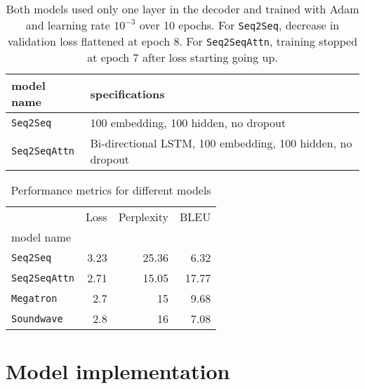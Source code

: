 \documentclass[12pt]{article}
\begin{document}
\begin{landscape}
\begin{table}[tb]
    
    \centering
\begin{tabular}{ll}
\toprule
model name                   &specifications\\
\midrule
\texttt{Seq2Seq} & 100 embedding, 100 hidden, no dropout\\
\texttt{Seq2SeqAttn} & Bi-directional LSTM, 100 embedding, 100 hidden, no dropout\\
\bottomrule
\end{tabular}
    \caption{Both models used only one layer in the decoder and trained with Adam and learning rate $10^{-3}$ over 10 epochs. For \texttt{Seq2Seq}, decrease in validation loss flattened at epoch 8. For \texttt{Seq2SeqAttn}, training stopped at epoch 7 after loss starting going up.}
    \label{tab:spec}
\end{table}
\begin{table}[h]
\centering
\begin{tabular}{lrrr}
\toprule
{}                                     & Loss  & Perplexity & BLEU \\
model name                             &       &        & \\
\midrule
\texttt{Seq2Seq}                      & 3.23 & 25.36  & 6.32 \\
\texttt{Seq2SeqAttn}                      & 2.71 & 15.05  & 17.77 \\
\texttt{Megatron} & 2.7 & 15 & 9.68 \\
\texttt{Soundwave} & 2.8 & 16 & 7.08\\
\bottomrule
\end{tabular}
\caption{Performance metrics for different models}
\label{table:performance}
\end{table}
\end{landscape}




\appendix
\section{Model implementation}





\end{document}
